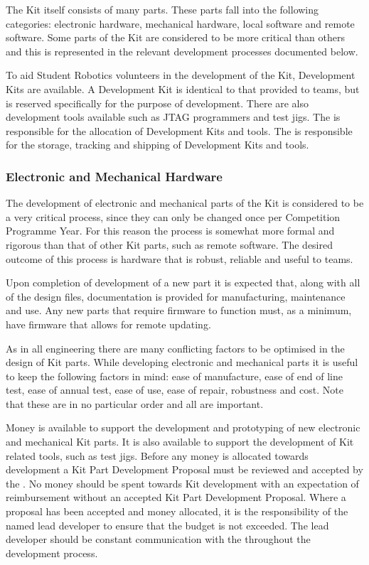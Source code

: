 \begin{draft}
The Kit itself consists of many parts. These parts fall into the following categories: electronic hardware, mechanical hardware, local software and remote software. Some parts of the Kit are considered to be more critical than others and this is represented in the relevant development processes documented below.

To aid Student Robotics volunteers in the development of the Kit, Development Kits are available. A Development Kit is identical to that provided to teams, but is reserved specifically for the purpose of development. There are also development tools available such as JTAG programmers and test jigs. The  is responsible for the allocation of Development Kits and tools. The  is responsible for the storage, tracking and shipping of Development Kits and tools.

\subsubsection{Electronic and Mechanical Hardware}

The development of electronic and mechanical parts of the Kit is considered to be a very critical process, since they can only be changed once per Competition Programme Year. For this reason the process is somewhat more formal and rigorous than that of other Kit parts, such as remote software. The desired outcome of this process is hardware that is robust, reliable and useful to teams.

Upon completion of development of a new part it is expected that, along with all of the design files, documentation is provided for manufacturing, maintenance and use. Any new parts that require firmware to function must, as a minimum, have firmware that allows for remote updating.

As in all engineering there are many conflicting factors to be optimised in the design of Kit parts. While developing electronic and mechanical parts it is useful to keep the following factors in mind: ease of manufacture, ease of end of line test, ease of annual test, ease of use, ease of repair, robustness and cost. Note that these are in no particular order and all are important.

Money is available to support the development and prototyping of new electronic and mechanical Kit parts. It is also available to support the development of Kit related tools, such as test jigs. Before any money is allocated towards development a Kit Part Development Proposal must be reviewed and accepted by the . No money should be spent towards Kit development with an expectation of reimbursement without an accepted Kit Part Development Proposal. Where a proposal has been accepted and money allocated, it is the responsibility of the named lead developer to ensure that the budget is not exceeded. The lead developer should be constant communication with the  throughout the development process.


\end{draft}
